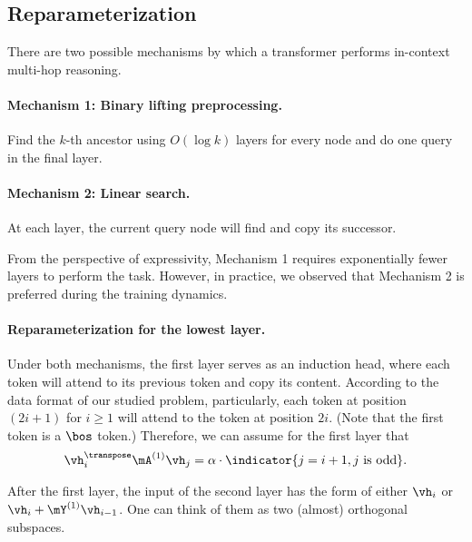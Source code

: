 \subsection{Reparameterization}

There are two possible mechanisms by which a transformer performs in-context multi-hop reasoning.

\paragraph{Mechanism 1:  Binary lifting preprocessing.} Find the $k$-th ancestor using $O(\log k)$ layers for every node and do one query in the final layer. 

\paragraph{Mechanism 2: Linear search.} At each layer, the current query node will find and copy its successor. 

From the perspective of expressivity, Mechanism 1 requires exponentially fewer layers to perform the task. However, in practice, we observed that Mechanism 2 is preferred during the training dynamics.

\paragraph{Reparameterization for the lowest layer.} Under both mechanisms, the first layer serves as an induction head, where each token will attend to its previous token and copy its content. According to the data format of our studied problem, particularly, each token at position $(2i+1)$ for $i \geq 1$ will attend to the token at position $2i$. (Note that the first token is a $\bos$ token.) Therefore, we can assume for the first layer that
\begin{equation}
\label{eq:reparam_layer_1}
\begin{aligned}
    \vh_i^\transpose\mA^{(1)}\vh_j = \alpha \cdot \indicator\{ j=i+1, j \text{ is odd} \}.
\end{aligned}    
\end{equation}

After the first layer, the input of the second layer has the form of either $\vh_i$ or $\vh_i + \mY^{(1)}\vh_{i-1}$. One can think of them as two (almost) orthogonal subspaces. 



